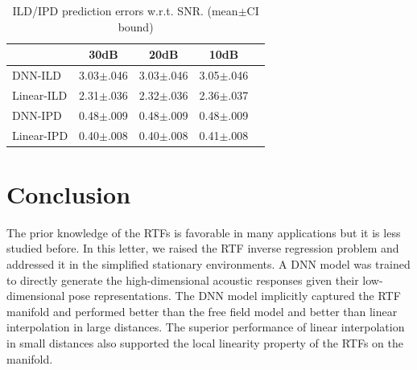 \documentclass[journal]{IEEEtran}
\begin{document}
\begin{table}
\caption{ILD/IPD prediction errors w.r.t. SNR. (mean$\pm$CI bound)}
\label{table:noise}
\begin{center}
\begin{tabular}{|l|c|c|c|c|}
  \hline
                 & 30dB         & 20dB         & 10dB       \\ \hline \hline
   DNN-ILD     &3.03$\pm$.046  &3.03$\pm$.046 &3.05$\pm$.046  \\ \hline
   Linear-ILD  &2.31$\pm$.036  &2.32$\pm$.036 &2.36$\pm$.037   \\ \hline
   DNN-IPD     & 0.48$\pm$.009 & 0.48$\pm$.009 & 0.48$\pm$.009 \\ \hline
   Linear-IPD  & 0.40$\pm$.008 & 0.40$\pm$.008 &0.41$\pm$.008  \\ \hline
\end{tabular}
\end{center}
\end{table}


\section{Conclusion}

The prior knowledge of the RTFs is favorable in many applications but it is less studied before. In this letter, we raised the RTF inverse regression problem and addressed it in the simplified stationary environments. A DNN model was trained to directly generate the high-dimensional acoustic responses given their low-dimensional pose representations. The DNN model implicitly captured the RTF manifold and performed better than the free field model and better than linear interpolation in large distances. The superior performance of linear interpolation in small distances also supported the local linearity property of the RTFs on the manifold.

\end{document}

